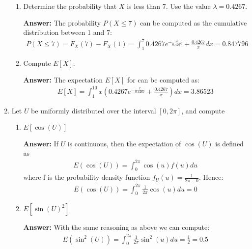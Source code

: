 \documentclass[letterpaper,12pt]{article}
\begin{document}
\begin{enumerate}
\begin{enumerate}
    \item Determine the probability that $X$ is less than 7. Use the value $\lambda = 0.4267$.
    \begin{tcolorbox}
    \textbf{Answer:}
    The probability $P(X \leq 7)$ can be computed as the cumulative distribution between 1 and 7:
    \begin{gather*}
    P(X \leq 7) = F_{X}(7) - F_{X}(1) = \int_{1}^{7} 0.4267 e^{-\frac{x}{0.4267}} + \frac{0.4267}{x} dx = 0.847796
    \end{gather*}
    \end{tcolorbox}
    
    \item Compute $E[X]$.
    \begin{tcolorbox}
    \textbf{Answer:}
    The expectation $E[X]$ for can be computed as:
    \begin{gather*}
    E[X] = \int_{1}^{10} x \left (0.4267 e^{-\frac{x}{0.4267}} + \frac{0.4267}{x} \right ) dx = 3.86523 
    \end{gather*}
    \end{tcolorbox}
  \end{enumerate}
  
  \item Let $U$ be uniformly distributed over the interval $[0, 2\pi]$, and compute
  \begin{enumerate}
    \item $E[\cos(U)]$
    \begin{tcolorbox}
    \textbf{Answer:}
     If $U$ is continuous, then the expectation of $\cos(U)$ is defined as
    \begin{gather*}
    E(\cos(U)) = \int_{0}^{2\pi} \cos(u) f(u) du
    \end{gather*}
    where f is the probability density function $f_{U}(u) = \frac{1}{2\pi - 0}$. Hence:
    \begin{gather*}
    E(\cos(U)) = \int_{0}^{2\pi} \frac{1}{2\pi} \cos(u) du = 0
    \end{gather*}
    \end{tcolorbox}
    
    \item $E[\sin(U)^{2}]$
    \begin{tcolorbox}
    \textbf{Answer:}
    With the same reasoning as above we can compute:
    \begin{gather*}
    E(\sin^{2}(U)) = \int_{0}^{2\pi} \frac{1}{2\pi} \sin^{2}(u) du = \frac{1}{2} = 0.5
    \end{gather*}
    \end{tcolorbox}
  \end{enumerate}
  

\end{enumerate}
\end{document}

